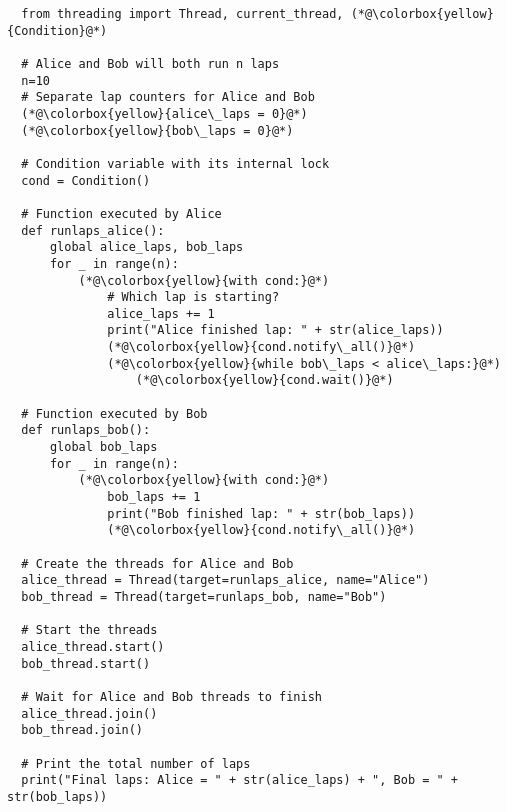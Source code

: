 \documentclass{article}
\begin{document}
\begin{enumerate}[label=\textbf{\makebox[1cm][l]{\Huge\text{(\stylishfont\alph*)}}}, leftmargin=!, labelindent=0pt]
\begin{lstlisting}
  from threading import Thread, current_thread, (*@\colorbox{yellow}{Condition}@*)

  # Alice and Bob will both run n laps
  n=10
  # Separate lap counters for Alice and Bob
  (*@\colorbox{yellow}{alice\_laps = 0}@*)
  (*@\colorbox{yellow}{bob\_laps = 0}@*)
  
  # Condition variable with its internal lock
  cond = Condition()
  
  # Function executed by Alice
  def runlaps_alice():
      global alice_laps, bob_laps
      for _ in range(n):
          (*@\colorbox{yellow}{with cond:}@*)
              # Which lap is starting?
              alice_laps += 1
              print("Alice finished lap: " + str(alice_laps))
              (*@\colorbox{yellow}{cond.notify\_all()}@*)
              (*@\colorbox{yellow}{while bob\_laps < alice\_laps:}@*)
                  (*@\colorbox{yellow}{cond.wait()}@*)
  
  # Function executed by Bob
  def runlaps_bob():
      global bob_laps
      for _ in range(n):
          (*@\colorbox{yellow}{with cond:}@*)
              bob_laps += 1
              print("Bob finished lap: " + str(bob_laps))
              (*@\colorbox{yellow}{cond.notify\_all()}@*)
  
  # Create the threads for Alice and Bob
  alice_thread = Thread(target=runlaps_alice, name="Alice")
  bob_thread = Thread(target=runlaps_bob, name="Bob")
  
  # Start the threads
  alice_thread.start()
  bob_thread.start()
  
  # Wait for Alice and Bob threads to finish
  alice_thread.join()
  bob_thread.join()
  
  # Print the total number of laps
  print("Final laps: Alice = " + str(alice_laps) + ", Bob = " + str(bob_laps))
  \end{lstlisting}


\end{enumerate}










\newpage
\end{document}
